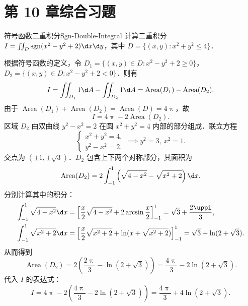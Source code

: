 \section{第 10 章综合习题}

\begin{problem}{符号函数二重积分}{Sgn-Double-Integral}
    计算二重积分 $I = \iint_{D} \operatorname{sgn}(x^2 - y^2 + 2) \d x \d y$，其中 $D = \{(x, y) : x^2 + y^2 \le 4\}$．
\end{problem}

\begin{solution}
    根据符号函数的定义，令 $D_1 = \{(x, y) \in D : x^2 - y^2 + 2 \ge 0\}$，$D_2 = \{(x, y) \in D : x^2 - y^2 + 2 < 0\}$．则有
    \begin{equation}
        I = \iint_{D_1} 1 \d A - \iint_{D_2} 1 \d A = \operatorname{Area}(D_1) - \operatorname{Area}(D_2).
    \end{equation}
    由于 $\operatorname{Area}(D_1) + \operatorname{Area}(D_2) = \operatorname{Area}(D) = 4\uppi$，故
    \begin{equation}
        I = 4\uppi - 2\operatorname{Area}(D_2).
    \end{equation}
    区域 $D_2$ 由双曲线 $y^2 - x^2 = 2$ 在圆 $x^2 + y^2 = 4$ 内部的部分组成．联立方程
    \begin{equation}
        \begin{cases}
            x^2 + y^2 = 4, \\
            y^2 - x^2 = 2.
        \end{cases} \implies y^2 = 3, \ x^2 = 1.
    \end{equation}
    交点为 $(\pm 1, \pm \sqrt{3})$．$D_2$ 包含上下两个对称部分，其面积为
    \begin{equation}
        \operatorname{Area}(D_2) = 2 \int_{-1}^1 \left( \sqrt{4-x^2} - \sqrt{x^2+2} \right) \d x.
    \end{equation}
    分别计算其中的积分：
    \begin{equation}
        \begin{aligned}
            \int_{-1}^1 \sqrt{4-x^2} \d x & = \left[ \frac{x}{2}\sqrt{4-x^2} + 2\arcsin \frac{x}{2} \right]_{-1}^1 = \sqrt{3} + \frac{2\uppi}{3}, \\
            \int_{-1}^1 \sqrt{x^2+2} \d x & = \left[ \frac{x}{2}\sqrt{x^2+2} + \ln(x + \sqrt{x^2+2}) \right]_{-1}^1 = \sqrt{3} + \ln(2+\sqrt{3}).
        \end{aligned}
    \end{equation}
    从而得到
    \begin{equation}
        \operatorname{Area}(D_2) = 2 \left( \frac{2\uppi}{3} - \ln(2+\sqrt{3}) \right) = \frac{4\uppi}{3} - 2\ln(2+\sqrt{3}).
    \end{equation}
    代入 $I$ 的表达式：
    \begin{equation}
        I = 4\uppi - 2 \left( \frac{4\uppi}{3} - 2\ln(2+\sqrt{3}) \right) = \frac{4\uppi}{3} + 4\ln(2+\sqrt{3}).
    \end{equation}


\end{solution}
